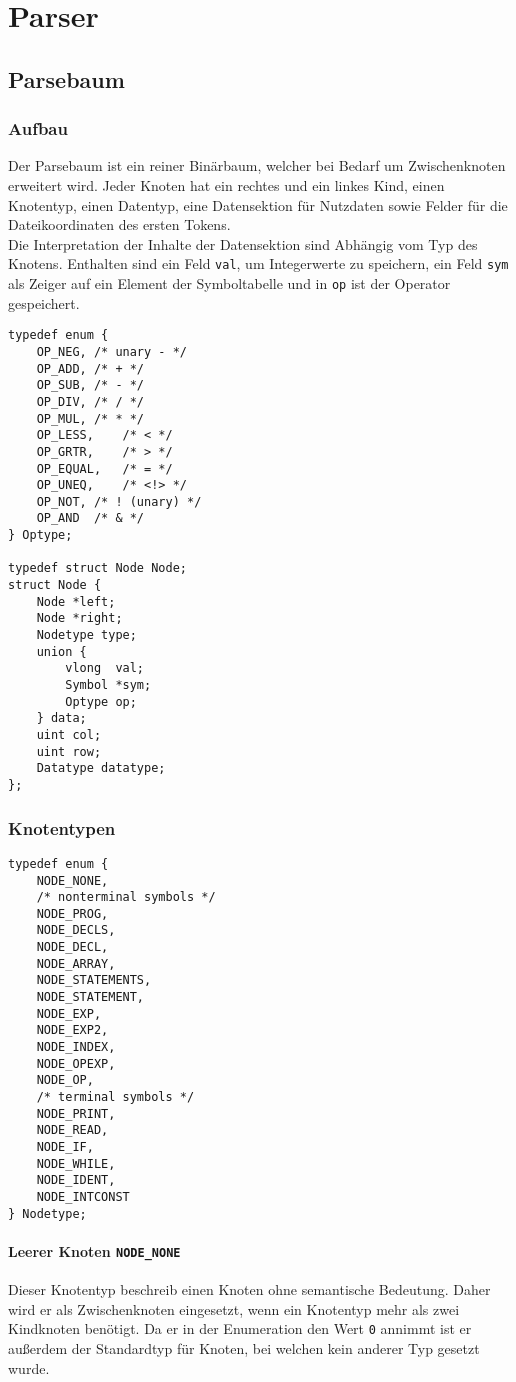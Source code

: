 \chapter{Parser}
\label{chap:parser}

\section{Parsebaum}
\label{sec:parsetree}

\subsection{Aufbau}
Der Parsebaum ist ein reiner Binärbaum,
welcher bei Bedarf um Zwischenknoten erweitert wird.
Jeder Knoten hat ein rechtes und ein linkes Kind,
einen Knotentyp, einen Datentyp,
eine Datensektion für Nutzdaten sowie Felder für die Dateikoordinaten des ersten Tokens. \\
Die Interpretation der Inhalte der Datensektion sind Abhängig vom Typ des Knotens.
Enthalten sind ein Feld \texttt{val},
um Integerwerte zu speichern,
ein Feld \texttt{sym} als Zeiger auf ein Element der Symboltabelle
und in \texttt{op} ist der Operator gespeichert.

\begin{lstlisting}
typedef enum {
	OP_NEG,	/* unary - */
	OP_ADD,	/* + */
	OP_SUB,	/* - */
	OP_DIV,	/* / */
	OP_MUL,	/* * */
	OP_LESS,	/* < */
	OP_GRTR,	/* > */
	OP_EQUAL,	/* = */
	OP_UNEQ,	/* <!> */
	OP_NOT,	/* ! (unary) */
	OP_AND	/* & */
} Optype;

typedef struct Node Node;
struct Node {
	Node *left;
	Node *right;
	Nodetype type;
	union {
		vlong  val;
		Symbol *sym;
		Optype op;
	} data;
	uint col;
	uint row;
	Datatype datatype;
};
\end{lstlisting}

\subsection{Knotentypen}

\begin{lstlisting}
typedef enum {
	NODE_NONE,
	/* nonterminal symbols */
	NODE_PROG,
	NODE_DECLS,
	NODE_DECL,
	NODE_ARRAY,
	NODE_STATEMENTS,
	NODE_STATEMENT,
	NODE_EXP,
	NODE_EXP2,
	NODE_INDEX,
	NODE_OPEXP,
	NODE_OP,
	/* terminal symbols */
	NODE_PRINT,
	NODE_READ,
	NODE_IF,
	NODE_WHILE,
	NODE_IDENT,
	NODE_INTCONST
} Nodetype;
\end{lstlisting}

\subsubsection{Leerer Knoten \texttt{NODE\_NONE}}
\label{sec:nonenode}
Dieser Knotentyp beschreib einen Knoten ohne semantische Bedeutung.
Daher wird er als Zwischenknoten eingesetzt,
wenn ein Knotentyp mehr als zwei Kindknoten benötigt.
Da er in der Enumeration den Wert \texttt{0} annimmt ist er außerdem der Standardtyp für Knoten,
bei welchen kein anderer Typ gesetzt wurde.

